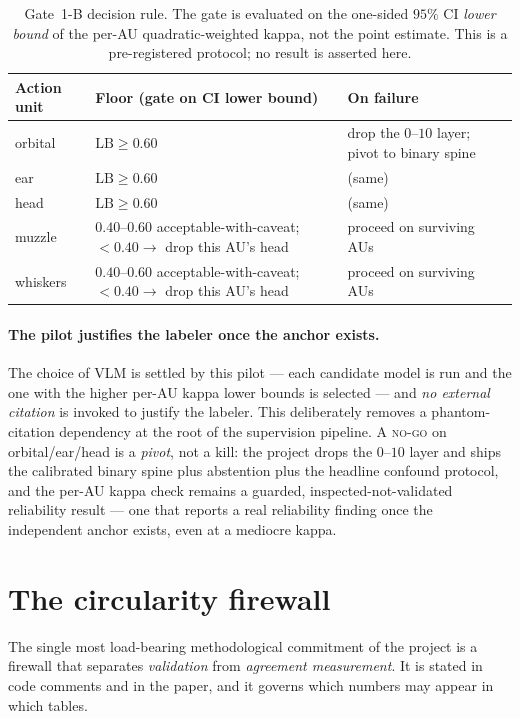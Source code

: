 \begin{table}[t]
\centering
\caption[Gate 1-B per-AU kappa decision rule]{Gate~1-B decision rule. The gate
is evaluated on the one-sided $95\%$ CI \emph{lower bound} of the per-AU
quadratic-weighted kappa, not the point estimate. This is a pre-registered
protocol; no result is asserted here.}
\label{tab:kappa-gate}
\begin{tabular}{@{}lll@{}}
\toprule
Action unit & Floor (gate on CI lower bound) & On failure \\
\midrule
orbital  & $\mathrm{LB} \geq 0.60$ & drop the $0$--$10$ layer; pivot to binary spine \\
ear      & $\mathrm{LB} \geq 0.60$ & (same) \\
head     & $\mathrm{LB} \geq 0.60$ & (same) \\
muzzle   & $0.40$--$0.60$ acceptable-with-caveat; $<0.40 \to$ drop this AU's head & proceed on surviving AUs \\
whiskers & $0.40$--$0.60$ acceptable-with-caveat; $<0.40 \to$ drop this AU's head & proceed on surviving AUs \\
\bottomrule
\end{tabular}
\end{table}

\paragraph{The pilot justifies the labeler once the anchor exists.} The choice of VLM is settled
by this pilot --- each candidate model is run and the one with the higher per-AU
kappa lower bounds is selected --- and \emph{no external citation} is invoked to
justify the labeler. This deliberately removes a phantom-citation dependency at
the root of the supervision pipeline. A \textsc{no-go} on orbital/ear/head is a
\emph{pivot}, not a kill: the project drops the $0$--$10$ layer and ships the
calibrated binary spine plus abstention plus the headline confound protocol, and the
per-AU kappa check remains a guarded, inspected-not-validated reliability result
--- one that reports a real reliability finding once the independent anchor
exists, even at a mediocre kappa.

\section{The circularity firewall}
\label{sec:firewall}

The single most load-bearing methodological commitment of the project is a
firewall that separates \emph{validation} from \emph{agreement measurement}. It
is stated in code comments and in the paper, and it governs which numbers may
appear in which tables.

